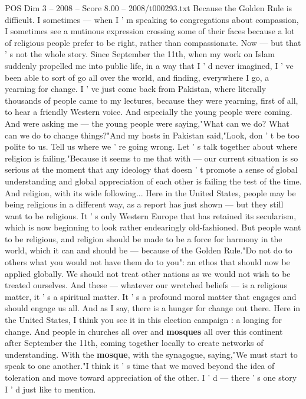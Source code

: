 \begin{textsample}{POS Dim 3 – 2008 – Score 8.00 – 2008/t000293.txt}
Because the Golden Rule is difficult.
I sometimes — when I ' m speaking to congregations about compassion, I sometimes see a mutinous expression crossing some of their faces because a lot of religious people prefer to be right, rather than compassionate.
Now — but that ' s not the whole story.
Since September the 11th, when my work on Islam suddenly propelled me into public life, in a way that I ' d never imagined, I ' ve been able to sort of go all over the world, and finding, everywhere I go, a yearning for change.
I ' ve just come back from Pakistan, where literally thousands of people came to my lectures, because they were yearning, first of all, to hear a friendly Western voice.
And especially the young people were coming.
And were asking me — the young people were saying,"What can we do?
What can we do to change things?"And my hosts in Pakistan said,"Look, don ' t be too polite to us.
Tell us where we ' re going wrong.
Let ' s talk together about where religion is failing."Because it seems to me that with — our current situation is so serious at the moment that any ideology that doesn ' t promote a sense of global understanding and global appreciation of each other is failing the test of the time.
And religion, with its wide following...
Here in the United States, people may be being religious in a different way, as a report has just shown — but they still want to be religious.
It ' s only Western Europe that has retained its secularism, which is now beginning to look rather endearingly old-fashioned.
But people want to be religious, and religion should be made to be a force for harmony in the world, which it can and should be — because of the Golden Rule."Do not do to others what you would not have them do to you": an ethos that should now be applied globally.
We should not treat other nations as we would not wish to be treated ourselves.
And these — whatever our wretched beliefs — is a religious matter, it ' s a spiritual matter.
It ' s a profound moral matter that engages and should engage us all.
And as I say, there is a hunger for change out there.
Here in the United States, I think you see it in this election campaign : a longing for change.
And people in churches all over and \textbf{mosques} all over this continent after September the 11th, coming together locally to create networks of understanding.
With the \textbf{mosque}, with the synagogue, saying,"We must start to speak to one another."I think it ' s time that we moved beyond the idea of toleration and move toward appreciation of the other.
I ' d — there ' s one story I ' d just like to mention.

\end{textsample}

